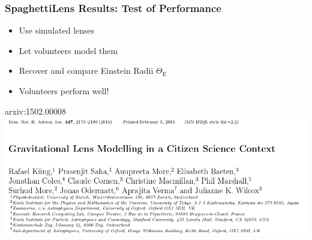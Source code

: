 \documentclass{beamer}
\begin{document}
%
%


 \begin{frame}
   \frametitle{SpaghettiLens Results: Test of Performance}
   \begin{itemize}
     \item Use simulated lenses
     \item Let volunteers model them
     \item Recover and compare Einstein Radii $\Theta_\text{E}$
     \item Volunteers perform well!
   \end{itemize}

   \begin{block}{arxiv:1502.00008}
     \includegraphics[width=\textwidth]{imgs/paper_sl1}
   \end{block}

 \end{frame}
\end{document}
